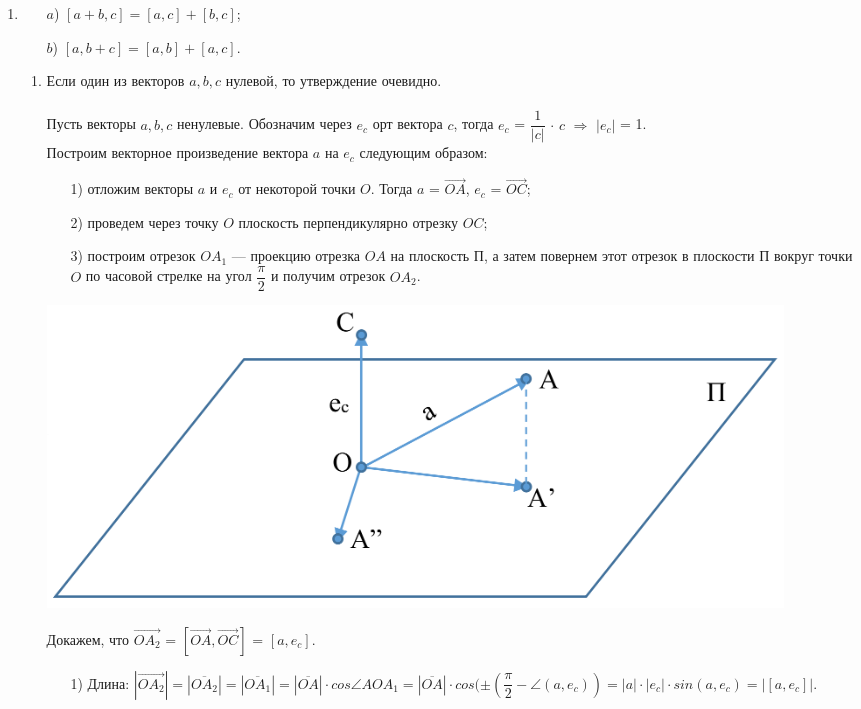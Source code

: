 \begin{enumerate}
\begin{Proof}
	\end{Proof}
	\item \begin{enumerate}
		\item[$a$)] $[a + b, c] = [a, c] + [b, c]$;
		\item[$b$)] $[a, b + c] = [a, b] + [a, c]$.
	\end{enumerate}
	\begin{Proof} \begin{enumerate}
			\item Если один из векторов $a, b, c$ нулевой, то утверждение очевидно.\\\\
			Пусть векторы $a, b, c$ ненулевые. Обозначим через $e_c$ орт вектора $c$, тогда $e_c$ = $\dfrac{1}{|c|}$ $\cdot$ $c$ $\Rightarrow$ $|e_c|$ = 1. \\
			Построим векторное произведение вектора $a$ на $e_c$ следующим образом:
			\begin{enumerate}
				\item [1)]отложим векторы $a$ и $e_c$ от некоторой точки $O$. Тогда $a$ = $\overrightarrow{OA}$, $e_c$ = $\overrightarrow{OC}$; 
				\item [2)] проведем через точку $O$ плоскость перпендикулярно отрезку $OC$;
				\item [3)] построим отрезок $O A_1$ --- проекцию отрезка $OA$ на плоскость П, а затем повернем этот отрезок в плоскости П вокруг точки $O$ по часовой стрелке на угол $\dfrac{\pi}{2}$ и получим отрезок $O A_2$.
			\end{enumerate}\begin{center}
				\includegraphics[scale=0.4]{images/pl_3_5.png}
			\end{center}
			Докажем, что $\overrightarrow{O A_2}$ = $[\overrightarrow{OA}, \overrightarrow{OC}]$ = $[a, e_c]$.
			\begin{enumerate}
				\item [1)] Длина: $|\overrightarrow{O A_2}| = |\overline{O A_2}| = |\overline{O A_1}| = |\overline{OA}|\cdot cos \angle AO A_1 = |\overline{OA}| \cdot cos (\pm (\dfrac{\pi}{2} - \angle(a, e_c)) = |a|\cdot|e_c|\cdot sin (a, e_c) = |[a, e_c]|$.\\

\end{enumerate}
\end{enumerate}
\end{Proof}
\end{enumerate}
